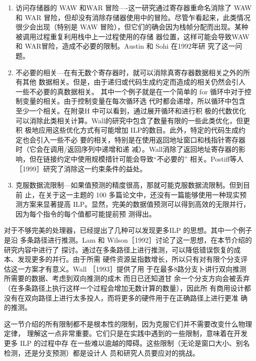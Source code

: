 \begin{enumerate}
    \item 访问存储器的 WAW 和WAR 冒险—-这一研究通过寄存器重命名消除了 WAW和 WAR
    冒险，但却没有消除存储器使用中的冒险。尽管乍看起来，此类情况很少会出现（特别是 WAW
    冒险），但它们的确会因为栈帧分配而出现。某种被调用过程重复利用栈中上一过程使用的存储
    器位置，这样可能会导致WAW和 WAR冒险，造成不必要的限制。Austin 和 Sohi 在1992年研
    究了这一问题。
    
    \item 不必要的相关—在有无数个寄存器时，就可以消除真寄存器数据相关之外的所有其他
    数据相关。但是，由于递归或代码生成约定而造成的相关仍然会引人一些不必要的真数据相关。
    其中一个例子就是在一个简单的 for 循环中对于控制变量的相关。由于控制变量在每次循环选
    代时都会递增，所以循环中包含至少一个相关。在附录H 中可以看到，通过展开循环和进行积
    极的代数优化可以消除此类相关计算。Wall的研究中包含了数量有限的一些此类优化，但更积
    极地应用这些优化方式有可能增加 ILP的数目。此外，特定的代码生成约定也会引入一些不必
    要的相关，特别是在使用返回地址窗口和栈指针寄存器时（它会在调用/返回序列中递增和递
    减）。Wall消除了返回地址寄存器的影响，但在链接约定中使用规模措针可能会导致“不必要的”
    相关。Postiff等人［1999］研究了消除这一约束条件的益处。
    \item 克服数据流限制—如果值预测的精度很高，那就可能克服数据流限制。但到目前
    止，在关于这一主题的 100 多篇论文中，还没有一篇能够使用一种现实预测方案来显著提高
    ILP。显然，完美的数据值预测可以得到高效的无限并行，因为每个指令的每个值都可能提前预
    测得出。
\end{enumerate}

对于不够完美的处理器，已经提出了几种可以发现更多ILP 的思想。其中一个例子是沿
多条路径进行推测。Lam 和 Wilson［1992］讨论了这一思想，在本节介绍的研究内容中进行了
探讨。通过在多条路径上进行推测，可以降低错误恢复的成本、发现更多的并行。由于所需
硬件资源呈指数增长，所以只有对有限个分支评估这一方案才有意义。Wall ［1993］提供了用
于在最多8路分支卜讲行双向推测所需要的数据、考虑到双向推测的成木 而日已还知道甘
余一个分支方向会被丢弃（在多条路径上执行这样一个过程会增加无数计算的数量），因此所
有商用设计都没有在双向路径上进行太多投人，而将更多的硬件用于在正确路径上进行更准
确的推测。

这一节介绍的所有限制都不是根本性的限制，因为克服它们并不需要改变什么物理定律，
理解这一点非常重要。它们只是在实践中遇到的一些限制，意味着在开发更多 ILP 的过程中存
在一些难以逾越的障碍。这些限制（无论是窗口大小、别名检测，还是分支预测）都是设计人
员和研究人员要应对的挑战。

